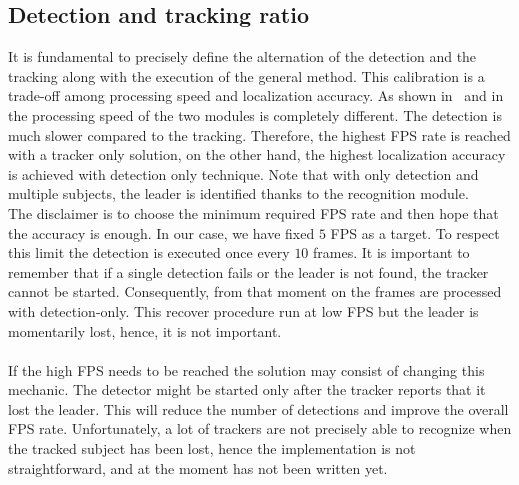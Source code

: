 \subsection{Detection and tracking ratio} \label{sec:ratioDetectTrack}
It is fundamental to precisely define the alternation of the detection and the tracking along with the execution of the general method. This calibration is a trade-off among processing speed and localization accuracy. As shown in~ and in~ the processing speed of the two modules is completely different. The detection is much slower compared to the tracking. Therefore, the highest FPS rate is reached with a tracker only solution, on the other hand, the highest localization accuracy is achieved with detection only technique. Note that with only detection and multiple subjects, the leader is identified thanks to the recognition module.\\
The disclaimer is to choose the minimum required FPS rate and then hope that the accuracy is enough. In our case, we have fixed $5$ FPS as a target. To respect this limit the detection is executed once every $10$ frames. It is important to remember that if a single detection fails or the leader is not found, the tracker cannot be started. Consequently, from that moment on the frames are processed with detection-only. This recover procedure run at low FPS but the leader is momentarily lost, hence, it is not important.\\
\\
If the high FPS needs to be reached the solution may consist of changing this mechanic. The detector might be started only after the tracker reports that it lost the leader. This will reduce the number of detections and improve the overall FPS rate. Unfortunately, a lot of trackers are not precisely able to recognize when the tracked subject has been lost, hence the implementation is not straightforward, and at the moment has not been written yet.


